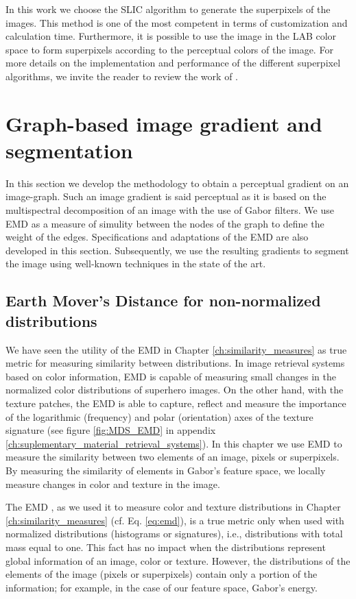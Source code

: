 In this work we choose the SLIC algorithm to generate the superpixels of the images. This method is one of the most competent in terms of customization and calculation time. Furthermore, it is possible to use the image in the LAB color space to form superpixels according to the perceptual colors of the image. For more details on the implementation and performance of the different superpixel algorithms, we invite the reader to review the work of \cite{Wang.Liu.ea:SP:2017}.

\section{Graph-based image gradient and segmentation}

In this section we develop the methodology to obtain a perceptual gradient on an image-graph. Such an image gradient is said perceptual as it is based on the multispectral decomposition of an image with the use of Gabor filters. We use EMD as a measure of simulity between the nodes of the graph to define the weight of the edges. Specifications and adaptations of the EMD are also developed in this section. Subsequently, we use the resulting gradients to segment the image using well-known techniques in the state of the art. 

\subsection{Earth Mover's Distance for non-normalized distributions}
We have seen the utility of the EMD in Chapter \ref{ch:similarity_measures} as true metric for measuring similarity between distributions. In image retrieval systems based on color information, EMD is capable of measuring small changes in the normalized color distributions of superhero images. On the other hand, with the texture patches, the EMD is able to capture, reflect and measure the importance of the logarithmic (frequency) and polar (orientation) axes of the texture signature (see figure \ref{fig:MDS_EMD}  in appendix \ref{ch:suplementary_material_retrieval_systems}). In this chapter we use EMD to measure the similarity between two elements of an image, pixels or superpixels. By measuring the similarity of elements in Gabor's feature space, we locally measure changes in color and texture in the image.

The EMD \citep{Rubner.Tomasi.ea:IJCV:2000} , as we used it to measure color and texture distributions in Chapter \ref{ch:similarity_measures} (cf. Eq. \eqref{eq:emd}), is a true metric only when used with normalized distributions (histograms or signatures), i.e., distributions with total mass equal to one. This fact has no impact when the distributions represent global information of an image, color or texture. However, the distributions of the elements of the image (pixels or superpixels) contain only a portion of the information; for example, in the case of our feature space, Gabor's energy.

